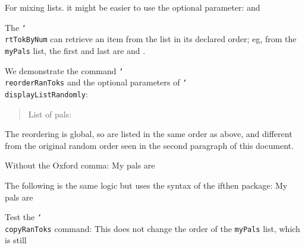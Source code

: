 \documentclass{article}
\def\cs#1{\texttt{\char`\\#1}}
\begin{document}
For mixing lists. it might be easier to use the optional parameter:
{} and 

The \cs{rtTokByNum} can retrieve an item from the list in its declared order;
eg, from the \texttt{myPals} list, the first and last are
{} and .

We demonstrate the command \cs{reorderRanToks} and the optional parameters of \cs{displayListRandomly}:
\begin{quote}%
List of pals: 
\end{quote}
The reordering is global, so 
are listed in the same order as above, and different from the original random order seen in the second paragraph
of this document.

Without the Oxford comma: My pals are

The following is the same logic but uses the syntax of the \textsf{ifthen} package: My pals are

Test the \cs{copyRanToks} command:
This does not change the order of the \texttt{myPals} list, which is still
\end{document}
